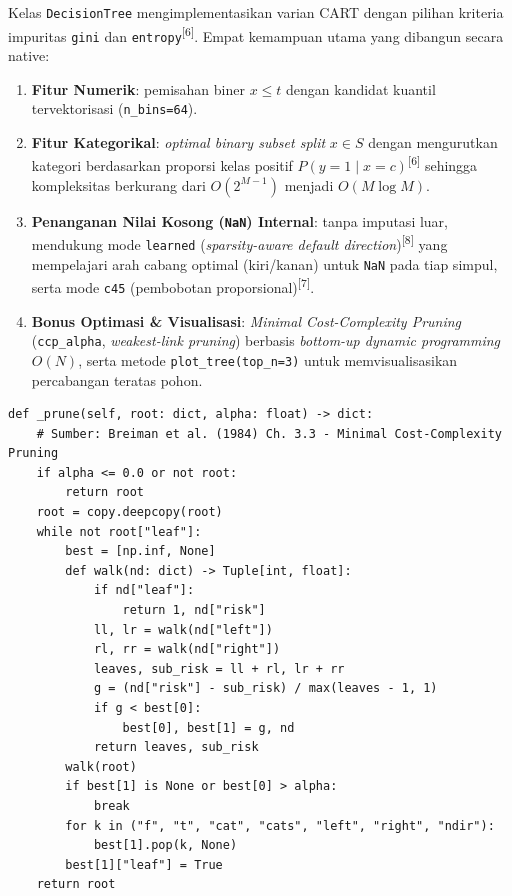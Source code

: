 \documentclass[11pt,a4paper]{article}
\numberwithin{figure}{section}
\numberwithin{table}{section}
\newcommand{\fnmark}[1]{\textsuperscript{[#1]}}
\begin{document}
Kelas \texttt{DecisionTree} mengimplementasikan varian CART dengan pilihan kriteria impuritas \texttt{gini} dan \texttt{entropy}\fnmark{6}. Empat kemampuan utama yang dibangun secara native:
\begin{enumerate}[leftmargin=1.4cm, itemsep=2pt]
  \item \textbf{Fitur Numerik}: pemisahan biner $x \le t$ dengan kandidat kuantil tervektorisasi (\texttt{n\_bins=64}).
  \item \textbf{Fitur Kategorikal}: \textit{optimal binary subset split} $x \in S$ dengan mengurutkan kategori berdasarkan proporsi kelas positif $P(y=1 \mid x=c)$\fnmark{6} sehingga kompleksitas berkurang dari $O(2^{M-1})$ menjadi $O(M \log M)$.
  \item \textbf{Penanganan Nilai Kosong (\texttt{NaN}) Internal}: tanpa imputasi luar, mendukung mode \texttt{learned} (\textit{sparsity-aware default direction})\fnmark{8} yang mempelajari arah cabang optimal (kiri/kanan) untuk \texttt{NaN} pada tiap simpul, serta mode \texttt{c45} (pembobotan proporsional)\fnmark{7}.
  \item \textbf{Bonus Optimasi \& Visualisasi}: \textit{Minimal Cost-Complexity Pruning} (\texttt{ccp\_alpha}, \textit{weakest-link pruning}) berbasis \textit{bottom-up dynamic programming} $O(N)$, serta metode \texttt{plot\_tree(top\_n=3)} untuk memvisualisasikan percabangan teratas pohon.
\end{enumerate}

\noindent\begin{minipage}{\linewidth}
\begin{lstlisting}
def _prune(self, root: dict, alpha: float) -> dict:
    # Sumber: Breiman et al. (1984) Ch. 3.3 - Minimal Cost-Complexity Pruning
    if alpha <= 0.0 or not root:
        return root
    root = copy.deepcopy(root)
    while not root["leaf"]:
        best = [np.inf, None]
        def walk(nd: dict) -> Tuple[int, float]:
            if nd["leaf"]:
                return 1, nd["risk"]
            ll, lr = walk(nd["left"])
            rl, rr = walk(nd["right"])
            leaves, sub_risk = ll + rl, lr + rr
            g = (nd["risk"] - sub_risk) / max(leaves - 1, 1)
            if g < best[0]:
                best[0], best[1] = g, nd
            return leaves, sub_risk
        walk(root)
        if best[1] is None or best[0] > alpha:
            break
        for k in ("f", "t", "cat", "cats", "left", "right", "ndir"):
            best[1].pop(k, None)
        best[1]["leaf"] = True
    return root
\end{lstlisting}
\end{minipage}
\end{document}
